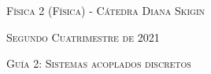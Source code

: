 \documentclass[11pt,spanish]{article}
\begin{document}
    \begin{center}
    \textsc{\large Física 2 (Física) - Cátedra Diana Skigin}
    \par\end{center}{\large \par}
    
    \begin{center}
    \textsc{\large Segundo  Cuatrimestre de 2021}
    \par\end{center}{\large \par}
    
    \begin{center}
    \textsc{\large Guía 2: Sistemas acoplados discretos}
    \par\end{center}{\large \par}
\end{document}
